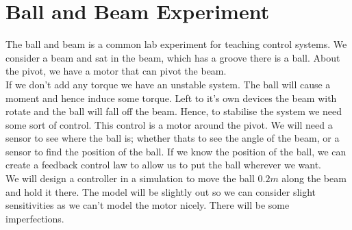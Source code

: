 
\section{Ball and Beam Experiment}
The ball and beam is a common lab experiment for teaching control systems. We consider a beam and sat in the beam, which has a groove there is a ball. About the pivot, we have a motor that can pivot the beam.\\

If we don't add any torque we have an unstable system. The ball will cause a moment and hence induce some torque. Left to it's own devices the beam with rotate and the ball will fall off the beam. Hence, to stabilise the system we need some sort of control. This control is a motor around the pivot. We will need a sensor to see where the ball is; whether thats to see the angle of the beam, or a sensor to find the position of the ball. If we know the position of the ball, we can create a feedback control law to allow us to put the ball wherever we want. \\

\noindent
We will design a controller in a simulation to move the ball $0.2m$ along the beam and hold it there. The model will be slightly out so we can consider slight sensitivities as we can't model the motor nicely. There will be some imperfections.
